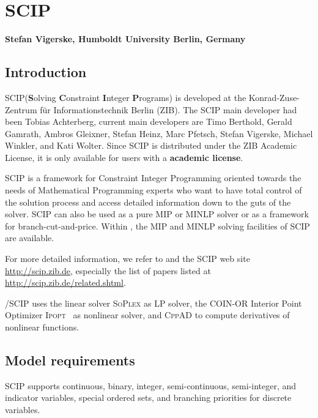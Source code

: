 
\newcommand{\SCIP}{\textsc{SCIP}\xspace}

\chapter{SCIP}
\textbf{Stefan Vigerske, Humboldt University Berlin, Germany}
\vspace{1cm}

\minitoc

\section{Introduction}

\SCIP (\textbf{S}olving \textbf{C}onstraint \textbf{I}nteger \textbf{P}rograms) is developed at the Konrad-Zuse-Zentrum f\"ur Informationstechnik Berlin (ZIB).
The \SCIP main developer had been Tobias Achterberg, current main developers are Timo Berthold, Gerald Gamrath, Ambros Gleixner, Stefan Heinz, Marc Pfetsch, Stefan Vigerske, Michael Winkler, and Kati Wolter.
Since \SCIP is distributed under the ZIB Academic License, it is only available for users with a \textbf{\GAMS academic license}.

\SCIP is a framework for Constraint Integer Programming oriented towards the needs of Mathematical Programming experts who want to have total control of the solution process and access detailed information down to the guts of the solver.
\SCIP can also be used as a pure MIP or MINLP solver or as a framework for branch-cut-and-price.
Within \GAMS, the MIP and MINLP solving facilities of \SCIP are available.

For more detailed information, we refer to \cite{Achterberg2007,Ach09,AchBeKoWo08,Berthold2006,BertholdHeinzVigerske2009,Vi12,Wolter2006} and the \SCIP web site \url{http://scip.zib.de}, especially the list of papers listed at \url{http://scip.zib.de/related.shtml}.

\GAMS/\SCIP uses the linear solver \textsc{SoPlex} \cite{Wunderling1996} as LP solver, the COIN-OR Interior Point Optimizer \textsc{Ipopt}~\cite{WaBi06} as nonlinear solver, and \textsc{CppAD} to compute derivatives of nonlinear functions.

\section{Model requirements}

\SCIP supports continuous, binary, integer, semi-continuous, semi-integer, and indicator variables, special ordered sets, and branching priorities for discrete variables.

